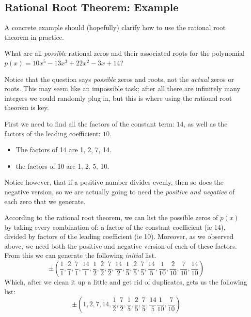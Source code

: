 \documentclass{ximera}
\begin{document}
    \subsection*{Rational Root Theorem: Example}
    
    A concrete example should (hopefully) clarify how to use the rational root theorem in practice.
    
    \begin{example}
        What are all \textit{possible} rational zeros and their associated roots for the polynomial $p(x) = 10x^5 - 13x^3 + 22x^2 - 3x + 14$?
        
        Notice that the question says \textit{possible} zeros and roots, not the \textit{actual} zeros or roots. This may seem like an impossible task; after all there are infinitely many integers we could randomly plug in, but this is where using the rational root theorem is key. 
        
        First we need to find all the factors of the constant term: $14$, as well as the factors of the leading coefficient: $10$. 
        
        \begin{itemize}
        \item The factors of 14 are 1, 2, 7, 14.
        \item the factors of 10 are 1, 2, 5, 10.
        \end{itemize} 
        
        Notice however, that if a positive number divides evenly, then so does the negative version, so we are actually going to need the \textit{positive and negative} of each zero that we generate.
    
        According to the rational root theorem, we can list the possible zeros of $p(x)$ by taking every combination of: a factor of the constant coefficient (ie 14), divided by factors of the leading coefficient (ie 10). Moreover, as we observed above, we need both the positive and negative version of each of these factors. From this we can generate the following \textit{initial} list.
        \[
            \pm \left(\frac{1}{1}, \frac{2}{1}, \frac{7}{1}, \frac{14}{1},
            \frac{1}{2}, \frac{2}{2}, \frac{7}{2}, \frac{14}{2},
            \frac{1}{5}, \frac{2}{5}, \frac{7}{5}, \frac{14}{5},
            \frac{1}{10}, \frac{2}{10}, \frac{7}{10}, \frac{14}{10}\right)
        \]
        Which, after we clean it up a little and get rid of duplicates, gets us the following list:
        \[
            \pm \left( 1, 2, 7, 14,
            \frac{1}{2}, \frac{7}{2},
            \frac{1}{5}, \frac{2}{5}, \frac{7}{5}, \frac{14}{5}
            \frac{1}{10}, \frac{7}{10}\right)
        \]
    

\end{example}
\end{document}
